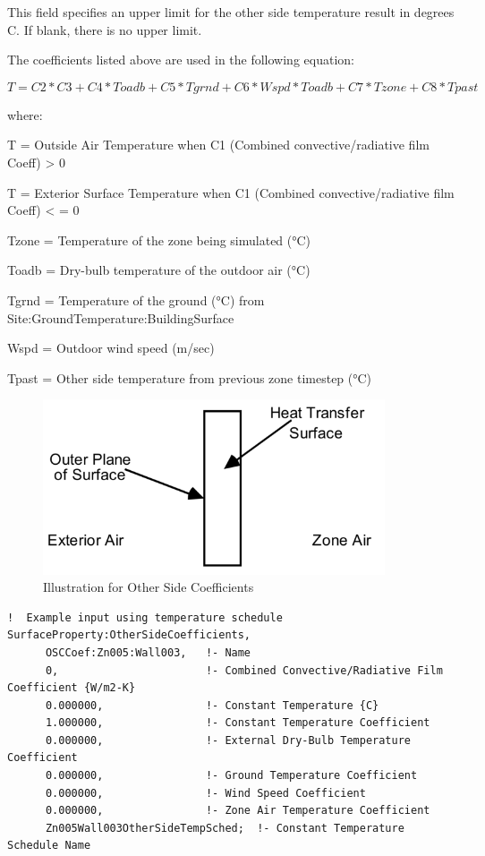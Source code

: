 This field specifies an upper limit for the other side temperature result in degrees C. If blank, there is no upper limit.

The coefficients listed above are used in the following equation:

\begin{equation}
T = C2*C3 + C4*Toadb + C5*Tgrnd + C6*Wspd*Toadb + C7*Tzone + C8*Tpast
\end{equation}

where:

T = Outside Air Temperature when C1 (Combined convective/radiative film Coeff) \textgreater{} 0

T = Exterior Surface Temperature when C1 (Combined convective/radiative film Coeff) \textless{} = 0

Tzone = Temperature of the zone being simulated (°C)

Toadb = Dry-bulb temperature of the outdoor air (°C)

Tgrnd = Temperature of the ground (°C) from Site:GroundTemperature:BuildingSurface

Wspd = Outdoor wind speed (m/sec)

Tpast = Other side temperature from previous zone timestep (°C)

\begin{figure}[hbtp] %
\centering
\includegraphics[width=0.9\textwidth, height=0.9\textheight, keepaspectratio=true]{media/image069.png}
\caption{Illustration for Other Side Coefficients \protect \label{fig:illustration-for-other-side-coefficients}}
\end{figure}

\begin{lstlisting}
!  Example input using temperature schedule
SurfaceProperty:OtherSideCoefficients,
      OSCCoef:Zn005:Wall003,   !- Name
      0,                       !- Combined Convective/Radiative Film Coefficient {W/m2-K}
      0.000000,                !- Constant Temperature {C}
      1.000000,                !- Constant Temperature Coefficient
      0.000000,                !- External Dry-Bulb Temperature Coefficient
      0.000000,                !- Ground Temperature Coefficient
      0.000000,                !- Wind Speed Coefficient
      0.000000,                !- Zone Air Temperature Coefficient
      Zn005Wall003OtherSideTempSched;  !- Constant Temperature Schedule Name
\end{lstlisting}

